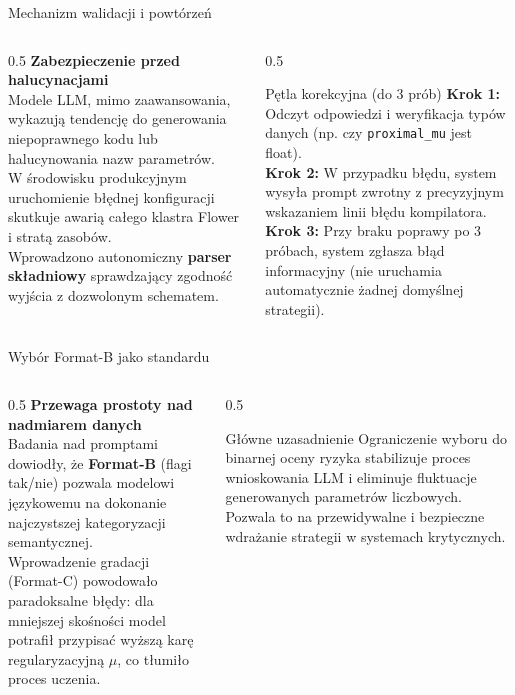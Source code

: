 \documentclass[9pt,aspectratio=169]{beamer}
\begin{document}
\begin{frame}{Mechanizm walidacji i powtórzeń}
\begin{columns}[T]
\begin{column}{0.5\textwidth}
\textbf{Zabezpieczenie przed halucynacjami}\\[4pt]
Modele LLM, mimo zaawansowania, wykazują tendencję do generowania niepoprawnego kodu lub halucynowania nazw parametrów.\\[6pt]
W środowisku produkcyjnym uruchomienie błędnej konfiguracji skutkuje awarią całego klastra Flower i stratą zasobów.\\[6pt]
Wprowadzono autonomiczny \textbf{parser składniowy} sprawdzający zgodność wyjścia z dozwolonym schematem.
\end{column}
\begin{column}{0.5\textwidth}
\begin{infoboxgreen}{Pętla korekcyjna (do 3 prób)}
\textbf{Krok 1:} Odczyt odpowiedzi i weryfikacja typów danych (np. czy \texttt{proximal\_mu} jest float).\\[3pt]
\textbf{Krok 2:} W przypadku błędu, system wysyła prompt zwrotny z precyzyjnym wskazaniem linii błędu kompilatora.\\[3pt]
\textbf{Krok 3:} Przy braku poprawy po 3 próbach, system zgłasza błąd informacyjny (nie uruchamia automatycznie żadnej domyślnej strategii).
\end{infoboxgreen}
\end{column}
\end{columns}
\end{frame}

\begin{frame}{Wybór Format-B jako standardu}
\begin{columns}[T]
\begin{column}{0.5\textwidth}
\textbf{Przewaga prostoty nad nadmiarem danych}\\[4pt]
Badania nad promptami dowiodły, że \textbf{Format-B} (flagi tak/nie) pozwala modelowi językowemu na dokonanie najczystszej kategoryzacji semantycznej.\\[6pt]
Wprowadzenie gradacji (Format-C) powodowało paradoksalne błędy: dla mniejszej skośności model potrafił przypisać wyższą karę regularyzacyjną $\mu$, co tłumiło proces uczenia.
\end{column}
\begin{column}{0.5\textwidth}
\begin{infobox}{Główne uzasadnienie}
Ograniczenie wyboru do binarnej oceny ryzyka stabilizuje proces wnioskowania LLM i eliminuje fluktuacje generowanych parametrów liczbowych. Pozwala to na przewidywalne i bezpieczne wdrażanie strategii w systemach krytycznych.
\end{infobox}
\end{column}
\end{columns}
\end{frame}
\end{document}
